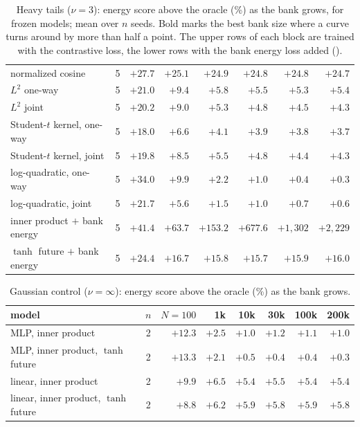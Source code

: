 \documentclass[11pt]{article}
\theoremstyle{plain}
\theoremstyle{definition}
\theoremstyle{remark}
\begin{document}
\begin{table}[ht]
\begin{tabular}{lcrrrrrr}
  normalized cosine & 5 & $+27.7$ & $+25.1$ & $+24.9$ & $+24.8$ & $+24.8$ & $+24.7$ \\
  $L^2$ one-way & 5 & $+21.0$ & $+9.4$ & $+5.8$ & $+5.5$ & $+5.3$ & $+5.4$ \\
  $L^2$ joint & 5 & $+20.2$ & $+9.0$ & $+5.3$ & $+4.8$ & $+4.5$ & $+4.3$ \\
  Student-$t$ kernel, one-way & 5 & $+18.0$ & $+6.6$ & $+4.1$ & $+3.9$ & $+3.8$ & $+3.7$ \\
  Student-$t$ kernel, joint & 5 & $+19.8$ & $+8.5$ & $+5.5$ & $+4.8$ & $+4.4$ & $+4.3$ \\
  log-quadratic, one-way & 5 & $+34.0$ & $+9.9$ & $+2.2$ & $+1.0$ & $+0.4$ & $+0.3$ \\
  log-quadratic, joint & 5 & $+21.7$ & $+5.6$ & $+1.5$ & $+1.0$ & $+0.7$ & $+0.6$ \\
  \midrule
  inner product $+$ bank energy & 5 & $\mathbf{+41.4}$ & $+63.7$ & $+153.2$ & $+677.6$ & $+1{,}302$ & $+2{,}229$ \\
  $\tanh$ future $+$ bank energy & 5 & $+24.4$ & $+16.7$ & $+15.8$ & $+15.7$ & $+15.9$ & $+16.0$ \\
  \bottomrule
 \end{tabular}
 \caption{Heavy tails ($\nu=3$): energy score above the oracle (\%) as the
  bank grows, for frozen models; mean over $n$ seeds. Bold marks the best
  bank size where a curve turns around by more than half a point. The upper
  rows of each block are trained with the contrastive loss, the lower rows
  with the bank energy loss added ().}
 \label{tab:banksweep}
\end{table}

\begin{table}[ht]
 \centering
 \footnotesize
 \setlength{\tabcolsep}{3.5pt}
 \begin{tabular}{lcrrrrrr}
  \toprule
  model & $n$ & $N=100$ & 1k & 10k & 30k & 100k & 200k \\
  \midrule
  MLP, inner product & 2 & $+12.3$ & $+2.5$ & $+1.0$ & $+1.2$ & $+1.1$ & $+1.0$ \\
  MLP, inner product, $\tanh$ future & 2 & $+13.3$ & $+2.1$ & $+0.5$ & $+0.4$ & $+0.4$ & $+0.3$ \\
  linear, inner product & 2 & $+9.9$ & $+6.5$ & $+5.4$ & $+5.5$ & $+5.4$ & $+5.4$ \\
  linear, inner product, $\tanh$ future & 2 & $+8.8$ & $+6.2$ & $+5.9$ & $+5.8$ & $+5.9$ & $+5.8$ \\
  \bottomrule
 \end{tabular}
 \caption{Gaussian control ($\nu=\infty$): energy score above the oracle (\%)
  as the bank grows.}
 \label{tab:gaussiancontrol}
\end{table}
\end{document}
